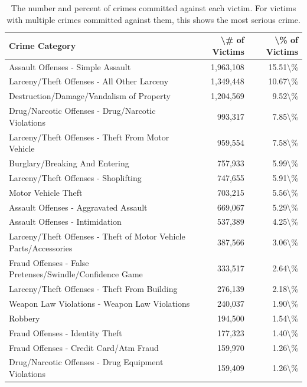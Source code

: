 \documentclass[
  12pt,
  openany]{book}
\begin{document}
\begin{longtable}[t]{lrr}
\caption{\label{tab:victimCrimeCategory}The number and percent of crimes committed against each victim. For victims with multiple crimes committed against them, this shows the most serious crime.}\\
\toprule
Crime Category & \textbackslash{}\# of Victims & \textbackslash{}\% of Victims\\
\midrule
Assault Offenses - Simple Assault & 1,963,108 & 15.51\textbackslash{}\%\\
Larceny/Theft Offenses - All Other Larceny & 1,349,448 & 10.67\textbackslash{}\%\\
Destruction/Damage/Vandalism of Property & 1,204,569 & 9.52\textbackslash{}\%\\
Drug/Narcotic Offenses - Drug/Narcotic Violations & 993,317 & 7.85\textbackslash{}\%\\
Larceny/Theft Offenses - Theft From Motor Vehicle & 959,554 & 7.58\textbackslash{}\%\\
\addlinespace
Burglary/Breaking And Entering & 757,933 & 5.99\textbackslash{}\%\\
Larceny/Theft Offenses - Shoplifting & 747,655 & 5.91\textbackslash{}\%\\
Motor Vehicle Theft & 703,215 & 5.56\textbackslash{}\%\\
Assault Offenses - Aggravated Assault & 669,067 & 5.29\textbackslash{}\%\\
Assault Offenses - Intimidation & 537,389 & 4.25\textbackslash{}\%\\
\addlinespace
Larceny/Theft Offenses - Theft of Motor Vehicle Parts/Accessories & 387,566 & 3.06\textbackslash{}\%\\
Fraud Offenses - False Pretenses/Swindle/Confidence Game & 333,517 & 2.64\textbackslash{}\%\\
Larceny/Theft Offenses - Theft From Building & 276,139 & 2.18\textbackslash{}\%\\
Weapon Law Violations - Weapon Law Violations & 240,037 & 1.90\textbackslash{}\%\\
Robbery & 194,500 & 1.54\textbackslash{}\%\\
\addlinespace
Fraud Offenses - Identity Theft & 177,323 & 1.40\textbackslash{}\%\\
Fraud Offenses - Credit Card/Atm Fraud & 159,970 & 1.26\textbackslash{}\%\\
Drug/Narcotic Offenses - Drug Equipment Violations & 159,409 & 1.26\textbackslash{}\%\\

\end{longtable}
\end{document}

